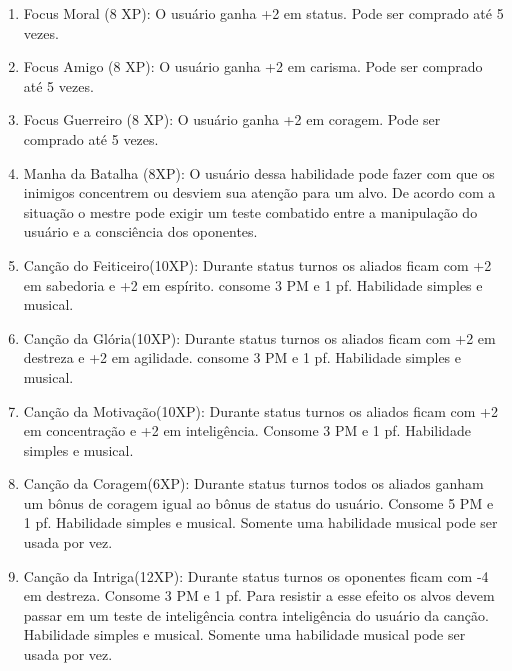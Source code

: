 \begin{enumerate}
  	\item Focus Moral (8 XP): O usuário ganha +2 em status. Pode ser comprado até 5 vezes.
  
  	\item Focus Amigo (8 XP): O usuário ganha +2 em carisma. Pode ser comprado até 5 vezes.
  
  	\item Focus Guerreiro (8 XP): O usuário ganha +2 em coragem. Pode ser comprado até 5 vezes.
  
		\item Manha da Batalha (8XP):  O usuário dessa habilidade pode fazer com que os inimigos concentrem ou desviem sua atenção para um alvo. De acordo com a situação o mestre pode exigir um teste combatido entre a manipulação do usuário e a consciência dos oponentes.

		\item Canção do Feiticeiro(10XP): Durante status turnos os aliados ficam com +2 em sabedoria e +2 em espírito. consome 3 PM e 1 pf. Habilidade simples e musical. %
	
		\item Canção da Glória(10XP): Durante status turnos os aliados ficam com +2 em destreza e +2 em agilidade. consome 3 PM e 1 pf. Habilidade simples e musical. %
		
		\item Canção da Motivação(10XP): Durante status turnos os aliados ficam com +2 em concentração e +2 em inteligência. Consome 3 PM e 1 pf. Habilidade simples e musical. %
		
		\item Canção da Coragem(6XP): Durante status turnos todos os aliados ganham um bônus de coragem igual ao bônus de status do usuário. Consome 5 PM e 1 pf. Habilidade simples e musical. Somente uma habilidade musical pode ser usada por vez.
	
		\item Canção da Intriga(12XP): Durante status turnos os oponentes ficam com -4 em destreza. Consome 3 PM e 1 pf. Para resistir a esse efeito os alvos devem passar em um teste de inteligência contra inteligência do usuário da canção. Habilidade simples e musical. Somente uma habilidade musical pode ser usada por vez. 
		

\end{enumerate}
